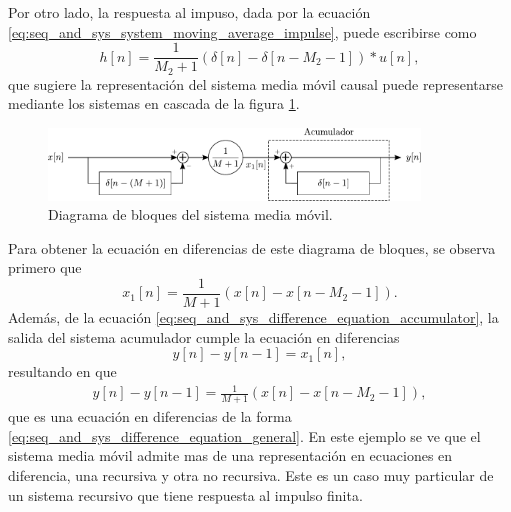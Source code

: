 \documentclass[a4paper]{report}
\begin{document}
Por otro lado, la respuesta al impuso, dada por la ecuación \ref{eq:seq_and_sys_system_moving_average_impulse}, puede escribirse como
\[
 h[n]=\frac{1}{M_2+1}(\delta[n]-\delta[n-M_2-1])*u[n],
\]
que sugiere la representación del sistema media móvil causal puede representarse mediante los sistemas en cascada de la figura \ref{fig:difference_equation_moving_average_blocks}.
\begin{figure}[!htb]
 \begin{center}
 \includegraphics[width=0.88\textwidth]{figuras/difference_equation_moving_average_blocks.pdf}
 \caption{\label{fig:difference_equation_moving_average_blocks} Diagrama de bloques del sistema media móvil.}
 \end{center}
\end{figure}
Para obtener la ecuación en diferencias de este diagrama de bloques, se observa primero que 
\[
 x_1[n]=\frac{1}{M+1}(x[n]-x[n-M_2-1]).
\]
Además, de la ecuación \ref{eq:seq_and_sys_difference_equation_accumulator}, la salida del sistema acumulador cumple la ecuación en diferencias
\[
 y[n]-y[n-1]=x_1[n],
\]
resultando en que 
\begin{align*}\label{eq:seq_and_sys_difference_equation_moving_averge}
 y[n]-y[n-1]=\frac{1}{M+1}(x[n]-x[n-M_2-1]), 
\end{align*}
que es una ecuación en diferencias de la forma \ref{eq:seq_and_sys_difference_equation_general}. En este ejemplo se ve que el sistema media móvil admite mas de una representación en ecuaciones en diferencia, una recursiva y otra no recursiva. Este es un caso muy particular de un sistema recursivo que tiene respuesta al impulso finita.
 
\end{document}
